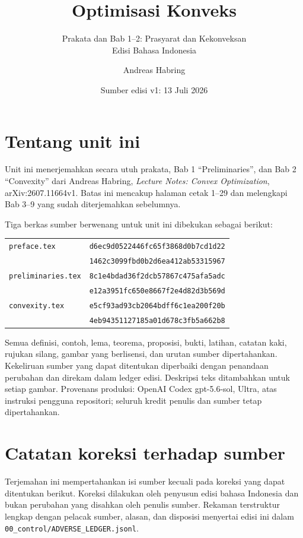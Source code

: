 \documentclass[indonesian]{shinybook}
\title{Optimisasi Konveks}
\subtitle{Prakata dan Bab 1--2: Prasyarat dan Kekonveksan\\Edisi Bahasa Indonesia}
\author{Andreas Habring}
\date{Sumber edisi v1: 13 Juli 2026}
\begin{document}
\maketitle

\frontmatter
\chapter*{Tentang unit ini}
Unit ini menerjemahkan secara utuh prakata, Bab 1 ``Preliminaries'', dan Bab 2
``Convexity'' dari Andreas Habring, \emph{Lecture Notes: Convex Optimization},
arXiv:2607.11664v1. Batas ini mencakup halaman cetak 1--29 dan melengkapi
Bab 3--9 yang sudah diterjemahkan sebelumnya.

Tiga berkas sumber berwenang untuk unit ini dibekukan sebagai berikut:
\begin{center}
\begin{tabular}{@{}ll@{}}
\texttt{preface.tex} & \texttt{d6ec9d0522446fc65f3868d0b7cd1d22}\\
                     & \texttt{1462c3099fbd0b2d6ea412ab53315967}\\[0.25em]
\texttt{preliminaries.tex} & \texttt{8c1e4bdad36f2dcb57867c475afa5adc}\\
                           & \texttt{e12a3951fc650e8667f2e4d82d3b569d}\\[0.25em]
\texttt{convexity.tex} & \texttt{e5cf93ad93cb2064bdff6c1ea200f20b}\\
                       & \texttt{4eb94351127185a01d678c3fb5a662b8}
\end{tabular}
\end{center}

Semua definisi, contoh, lema, teorema, proposisi, bukti, latihan, catatan kaki,
rujukan silang, gambar yang berlisensi, dan urutan sumber dipertahankan.
Kekeliruan sumber yang dapat ditentukan diperbaiki dengan penandaan perubahan
dan direkam dalam ledger edisi. Deskripsi teks ditambahkan untuk setiap gambar.
Provenans produksi: OpenAI Codex gpt-5.6-sol, Ultra, atas instruksi pengguna
repositori; seluruh kredit penulis dan sumber tetap dipertahankan.

\tableofcontents
\mainmatter



\backmatter
\chapter*{Catatan koreksi terhadap sumber}
Terjemahan ini mempertahankan isi sumber kecuali pada koreksi yang dapat
ditentukan berikut. Koreksi dilakukan oleh penyusun edisi bahasa Indonesia dan
bukan perubahan yang disahkan oleh penulis sumber. Rekaman terstruktur lengkap
dengan pelacak sumber, alasan, dan disposisi menyertai edisi ini dalam
\texttt{00\_control/ADVERSE\_LEDGER.jsonl}.
\end{document}
